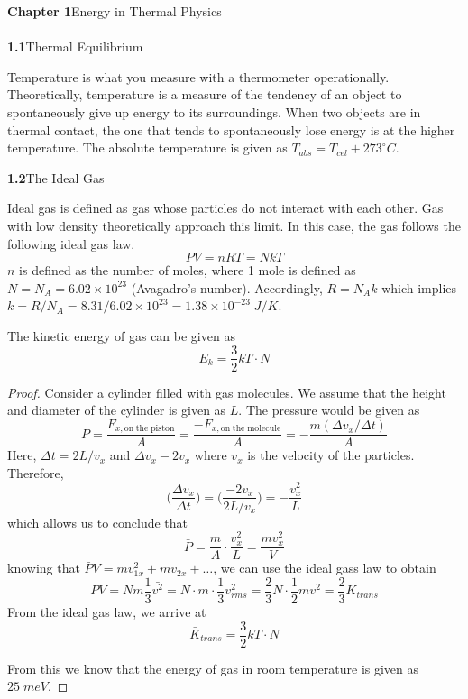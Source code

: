 \vspace{2ex}
{\bf Chapter 1}\hspace{2ex}Energy in Thermal Physics
\\\\
{\bf 1.1}\hspace{2ex}Thermal Equilibrium
\\
\begin{defi}
Temperature is what you measure with a thermometer operationally. Theoretically, temperature is a measure of the tendency of an object to spontaneously give up energy to its surroundings. When two objects are in thermal contact, the one that tends to spontaneously lose energy is at the higher temperature. The absolute temperature is given as $T_{abs}=T_{cel}+273^{\circ}C$.
\end{defi}
\vspace{2ex}
{\bf 1.2}\hspace{2ex}The Ideal Gas
\\
\begin{defi}
Ideal gas is defined as gas whose particles do not interact with each other. Gas with low density theoretically approach this limit. In this case, the gas follows the following ideal gas law.
\[PV=nRT=NkT\]
$n$ is defined as the number of moles, where 1 mole is defined as $N=N_{A}=6.02\times 10^{23}$ (Avagadro's number). Accordingly, $R=N_{A}k$ which implies $k=R/N_{A}=8.31/6.02\times 10^{23}=1.38\times 10^{-23}\;J/K$. 
\end{defi}
\vspace{2ex}
\begin{thm}
The kinetic energy of gas can be given as
\[E_{k}=\dfrac{3}{2}kT\cdot N\]
\end{thm}
\vspace{2ex}
\begin{proof}
Consider a cylinder filled with gas molecules. We assume that the height and diameter of the cylinder is given as $L$. The pressure would be given as
\[P=\dfrac{F_{x,\mathrm{on\;the\;piston}}}{A}=\dfrac{-F_{x,\mathrm{on\;the\;molecule}}}{A}=-\dfrac{m(\Delta v_{x}/\Delta t)}{A}\]
Here, $\Delta t=2L/v_{x}$ and $\Delta v_{x}-2v_{x}$ where $v_{x}$ is the velocity of the particles. Therefore,
\[\Big(\dfrac{\Delta v_{x}}{\Delta t}\Big)=\Big(\dfrac{-2v_{x}}{2L/v_{x}}\Big)=-\dfrac{v_{x}^2}{L}\]
which allows us to conclude that
\[\bar{P}=\dfrac{m}{A}\cdot \dfrac{v_{x}^2}{L}=\dfrac{mv_{x}^2}{V}\]
knowing that $\bar{P}V=mv_{1x}^2+mv_{2x}+\ldots $, we can use the ideal gass law to obtain
\[PV=Nm\dfrac{1}{3}\bar{v^2}=N\cdot m\cdot \dfrac{1}{3}v_{rms}^2=\dfrac{2}{3}N\cdot \dfrac{1}{2}mv^2=\dfrac{2}{3}\bar{K}_{trans}\]
From the ideal gas law, we arrive at
\[\bar{K}_{trans}=\dfrac{3}{2}kT\cdot N\]

From this we know that the energy of gas in room temperature is given as $25\;meV$. 
\end{proof}
\vspace{2ex}
